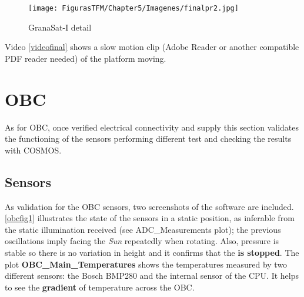 		\begin{figure} [H]
			\centering
			\texttt{[image: FigurasTFM/Chapter5/Imagenes/finalpr2.jpg]}
			\caption{GranaSat-I  detail} 	\label{final2}
			\vspace{-2cm}
\end{figure}

Video \autoref{videofinal} shows a slow motion clip (Adobe Reader or another compatible PDF reader needed) of the platform moving.

\vspace{-0.3cm}

\begin{videoFloat}[H]
\centering
{}
\caption{\acrshort{I2DOS} platform in movement (Adobe Reader needed)} \label{videofinal}
\end{videoFloat}
\vspace{-0.5cm}





\section{OBC} 

As for \acrshort{OBC}, once verified electrical connectivity and supply this section validates the functioning of the sensors performing different test and checking the results with COSMOS.

\vspace{-0.3cm}

\subsection{Sensors} 

As validation for the \acrshort{OBC} sensors, two screenshots of the  software are included. \autoref{obcfig1} illustrates the state of the sensors in a static position, as inferable from the static illumination received (see ADC\_Measurements plot); the previous oscillations imply facing the \textit{Sun} repeatedly when rotating. Also, pressure is stable so there is no variation in height and it confirms that the  \textbf{is stopped}. The plot \textbf{OBC\_Main\_Temperatures} shows the temperatures measured by two different sensors: the Bosch BMP280 and the internal sensor of the \acrshort{CPU}. It helps to see the \textbf{gradient} of temperature across the \acrshort{OBC}.

